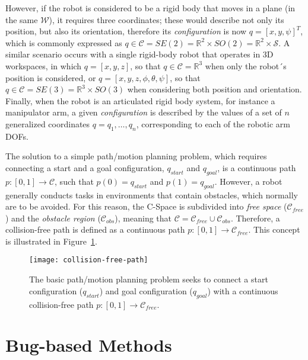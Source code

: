 However, if the robot is considered to be a rigid body that moves in a plane
(\ie in the same $\mathcal{W}$), it requires three coordinates; these would
describe not only its position, but also its orientation, therefore its
\textit{configuration} is now $q=[x,y,\psi]^T$, which is commonly expressed as
$q \in \mathcal{C} = SE(2) = \mathbb{R}^2 \times SO(2) = \mathbb{R}^2 \times
\mathcal{S}$. A similar scenario occurs with a single rigid-body robot that
operates in \ac{3D} workspaces, in which $q = [x,y,z]$, so that $q \in
\mathcal{C}=\mathbb{R}^3$ when only the robot´s position is considered, or $q =
[x,y,z, \phi, \theta, \psi]$, so that $q \in \mathcal{C} = SE(3) = \mathbb{R}^3
\times SO(3)$ when considering both position and orientation. Finally, when the
robot is an articulated rigid body system, for instance a manipulator arm, a
given \textit{configuration} is described by the values of a set of $n$
generalized coordinates $q = q_1, \ldots , q_n$, corresponding to each of the
robotic arm \acp{DOF}.

The solution to a simple path/motion planning problem, which requires connecting
a start and a goal configuration, $q_{start}$ and $q_{goal}$, is a continuous
path $p:[0,1] \rightarrow \mathcal{C}$, such that $p(0)=q_{start}$ and
$p(1)=q_{goal}$. However, a robot generally conducts tasks in environments that
contain obstacles, which normally are to be avoided. For this reason, the
\ac{C-Space} is subdivided into \textit{free space} ($\mathcal{C}_{free}$) and
the \textit{obstacle region} ($\mathcal{C}_{obs}$), meaning that $\mathcal{C} =
\mathcal{C}_{free} \cup \mathcal{C}_{obs}$. Therefore, a collision-free path is
defined as a continuous path $p:[0,1] \rightarrow \mathcal{C}_{free}$. This
concept is illustrated in Figure~\ref{fig:collision-free-path}.

\begin{figure}[htbp]
	\centering
	\texttt{[image: collision-free-path]}
\caption[The basic path/motion planning problem and the C-Space concept.]
{The basic path/motion planning problem seeks to connect a start configuration
($q_{start}$) and goal configuration ($q_{goal}$) with a continuous
collision-free path $p:[0,1] \rightarrow \mathcal{C}_{free}$.}
\label{fig:collision-free-path}
\end{figure}

\section{Bug-based Methods}

